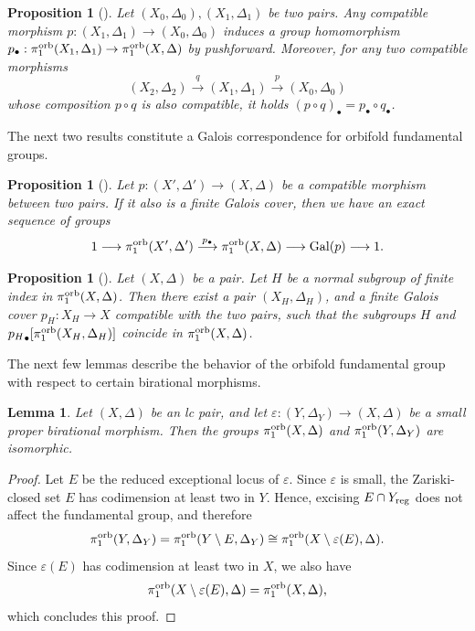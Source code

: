 \documentclass{amsart}
\newtheorem{lemma}[theorem]{Lemma}
\newtheorem{proposition}[theorem]{Proposition}
\theoremstyle{definition}
\theoremstyle{remark}
\numberwithin{equation}{section}
\begin{document}
\begin{proposition}[]
   Let $(X_0,\Delta_0), (X_1,\Delta_1)$ be two pairs. Any compatible morphism $p:(X_1,\Delta_1) \to (X_0,\Delta_0)$ induces a group homomorphism
$p_{\bullet}:\pi_1^{\rm orb}(X_1,\Delta_1)\to\pi_1^{\rm orb}(X,\Delta)$ by pushforward. Moreover, for any two compatible morphisms
$$(X_2,\Delta_2)\overset{q}{\longrightarrow} (X_1,\Delta_1) \overset{p}{\longrightarrow} (X_0,\Delta_0)$$
whose composition $p\circ q$ is also compatible, it holds $(p\circ q)_{\bullet} = p_{\bullet}\circ q_{\bullet}$.
 \end{proposition}


The next two results constitute a Galois correspondence for orbifold fundamental groups.
 
\begin{proposition}[]
\label{prop:galois1}
    Let $p:(X',\Delta') \to (X,\Delta)$ be a compatible morphism between two pairs. If it also is a finite Galois cover, then we have an exact sequence of groups
    $$1\longrightarrow \pi_1^{\rm orb}(X',\Delta') \overset{p_{\bullet}}{\longrightarrow} \pi_1^{\rm orb}(X,\Delta) \longrightarrow {\rm Gal}(p) \longrightarrow 1.$$
\end{proposition}

\begin{proposition}[]
\label{prop:galois2}
    Let $(X,\Delta)$ be a pair. Let $H$ be a normal subgroup of finite index in $\pi_1^{\rm orb}(X,\Delta)$. Then there exist a pair $(X_H,\Delta_H)$, and a finite Galois cover $p_H:X_H\to X$ compatible with the two pairs, such that the subgroups $H$ and
    ${p_H}_{\bullet}[\pi_1^{\rm orb}(X_H,\Delta_H)]$ coincide in $\pi_1^{\rm orb}(X,\Delta)$.
\end{proposition}

The next few lemmas describe the behavior of the orbifold fundamental group with respect to certain birational morphisms. 


\begin{lemma}\label{lem:Qfact-mod-vs-fun}
Let $(X,\Delta)$ be an lc pair, and let $\varepsilon:(Y,\Delta_Y)\to (X,\Delta)$ be a small proper birational morphism.
Then the groups
$\pi_1^{\rm orb}(X,\Delta)$ and $\pi_1^{\rm orb}(Y,\Delta_Y)$ are isomorphic.
\end{lemma}

\begin{proof}
Let $E$ be the reduced exceptional locus of $\varepsilon$. Since $\varepsilon$ is small, the Zariski-closed set $E$ has codimension at least two in $Y$. Hence, excising $E\cap Y_{\rm reg}$ does not affect the fundamental group, and therefore
$$\pi_1^{\rm orb}(Y,\Delta_Y) 
= \pi_1^{\rm orb}(Y\setminus E, \Delta_Y)
\cong \pi_1^{\rm orb}(X\setminus\varepsilon(E), \Delta).$$
Since $\varepsilon(E)$ has codimension at least two in $X$,
we also have
$$\pi_1^{\rm orb}(X\setminus\varepsilon(E), \Delta) = \pi_1^{\rm orb}(X, \Delta),$$ 
which concludes this proof.
\end{proof}
\end{document}
